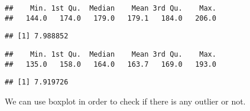 \documentclass[
]{article}
\newenvironment{Shaded}{\begin{snugshade}}{\end{snugshade}}
\newcommand{\KeywordTok}[1]{\textcolor[rgb]{0.13,0.29,0.53}{\textbf{#1}}}
\newcommand{\NormalTok}[1]{#1}
\newcommand{\OperatorTok}[1]{\textcolor[rgb]{0.81,0.36,0.00}{\textbf{#1}}}
\begin{document}
\begin{Shaded}
\end{Shaded}

\begin{verbatim}
##    Min. 1st Qu.  Median    Mean 3rd Qu.    Max. 
##   144.0   174.0   179.0   179.1   184.0   206.0
\end{verbatim}

\begin{Shaded}
\end{Shaded}

\begin{verbatim}
## [1] 7.988852
\end{verbatim}

\begin{Shaded}
\end{Shaded}

\begin{verbatim}
##    Min. 1st Qu.  Median    Mean 3rd Qu.    Max. 
##   135.0   158.0   164.0   163.7   169.0   193.0
\end{verbatim}

\begin{Shaded}
\end{Shaded}

\begin{verbatim}
## [1] 7.919726
\end{verbatim}

We can use boxplot in order to check if there is any outlier or not.
\end{document}

